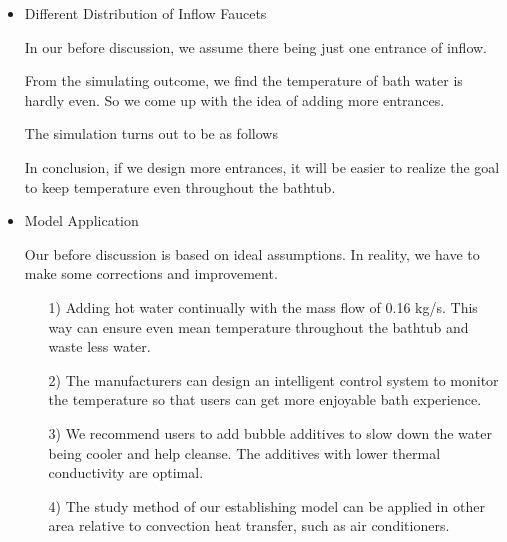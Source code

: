 \documentclass{mcmthesis}
\begin{document}
\begin{itemize}
\item Different Distribution of Inflow Faucets
    
In our before discussion, we assume there being just one entrance of inflow.
    
From the simulating outcome, we find the temperature of bath water is hardly even. 
So we come up with the idea of adding more entrances.
    
The simulation turns out to be as follows
    
    

In conclusion, if we design more entrances, it will be easier to realize the goal 
to keep temperature even throughout the bathtub.
    
\item Model Application
    
Our before discussion is based on ideal assumptions. In reality, we have to make 
some corrections and improvement.
    
\begin{itemize}
\item[1)] Adding hot water continually with the mass flow of 0.16 kg/s. This way 
can ensure even mean temperature throughout the bathtub and waste less water.
    
\item[2)] The manufacturers can design an intelligent control system to monitor 
the temperature so that users can get more enjoyable bath experience.
    
\item[3)] We recommend users to add bubble additives to slow down the water being 
cooler and help cleanse. The additives with lower thermal conductivity are optimal.
    
\item[4)] The study method of our establishing model can be applied in other area 
relative to convection heat transfer, such as air conditioners.
\end{itemize}
\end{itemize}
    
\printbibliography  %
    
\newpage
    
\end{document}
